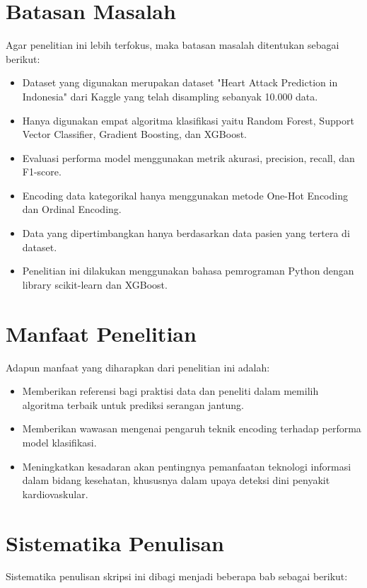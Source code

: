 \section{Batasan Masalah}

Agar penelitian ini lebih terfokus, maka batasan masalah ditentukan sebagai berikut:
\begin{itemize}
    \item Dataset yang digunakan merupakan dataset "Heart Attack Prediction in Indonesia" dari Kaggle yang telah disampling sebanyak 10.000 data.
    \item Hanya digunakan empat algoritma klasifikasi yaitu Random Forest, Support Vector Classifier, Gradient Boosting, dan XGBoost.
    \item Evaluasi performa model menggunakan metrik akurasi, precision, recall, dan F1-score.
    \item Encoding data kategorikal hanya menggunakan metode One-Hot Encoding dan Ordinal Encoding.
    \item Data yang dipertimbangkan hanya berdasarkan data pasien yang tertera di dataset.
    \item Penelitian ini dilakukan menggunakan bahasa pemrograman Python dengan library scikit-learn dan XGBoost.
\end{itemize}

\section{Manfaat Penelitian}
Adapun manfaat yang diharapkan dari penelitian ini adalah:
\begin{itemize}
    \item Memberikan referensi bagi praktisi data dan peneliti dalam memilih algoritma terbaik untuk prediksi serangan jantung.
    \item Memberikan wawasan mengenai pengaruh teknik encoding terhadap performa model klasifikasi.
    \item Meningkatkan kesadaran akan pentingnya pemanfaatan teknologi informasi dalam bidang kesehatan, khususnya dalam upaya deteksi dini penyakit kardiovaskular.
\end{itemize}

\section{Sistematika Penulisan}
Sistematika penulisan skripsi ini dibagi menjadi beberapa bab sebagai berikut:

